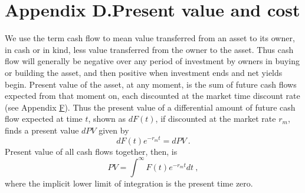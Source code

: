 \documentclass[a4padisinvitingper,fleqn]{latex_styles/cas-sc}
\begin{document}
\renewcommand{\theequation}{D.\arabic{equation}}
\setcounter{equation}{0}

\hypertarget{appendix-d}{%
\section*{Appendix D.\hspace{0.5em}Present value and cost}\label{appendix-d}}

We use the term cash flow to mean value transferred from an asset to its owner, in cash or in kind, less value transferred from the owner to the asset. Thus cash flow will generally be negative over any period of investment by owners in buying or building the asset, and then positive when investment ends and net yields begin. Present value of the asset, at any moment, is the sum of future cash flows expected from that moment on, each discounted at the market time discount rate (see Appendix \hyperref[appendix-f]{F}). 
Thus the present value of a differential amount of future cash flow expected at time \(t\), shown as \(d F(t)\), if discounted at the market rate \(r_{m}\), finds a present value \(d PV\) given by
\begin{equation}
    d F(t) e^{-r_{m} t} = d PV \ .\label{eq-d1}
\end{equation}
%
Present value of all cash flows together, then, is
\begin{equation}
    PV = \int^{\infty} F(t) e^{-r_{m} t} d t\ ,\label{eq-d2}
\end{equation}
%
where the implicit lower limit of integration is the present time zero.
%
\end{document}
